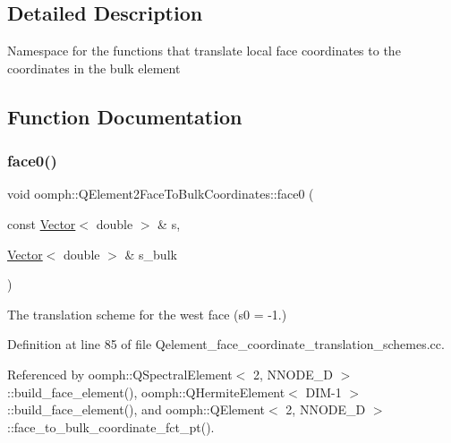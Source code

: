 \subsection{Detailed Description}
Namespace for the functions that translate local face coordinates to the coordinates in the bulk element 

\subsection{Function Documentation}
\mbox{\label{namespaceoomph_1_1QElement2FaceToBulkCoordinates_a4c5f3ae98dff82f924d0423db0e64d1c}} 
\subsubsection{\texorpdfstring{face0()}{face0()}}
{\footnotesize\ttfamily void oomph\+::\+Q\+Element2\+Face\+To\+Bulk\+Coordinates\+::face0 (\begin{DoxyParamCaption}\item[{const \hyperlink{classoomph_1_1Vector}{Vector}$<$ double $>$ \&}]{s,  }\item[{\hyperlink{classoomph_1_1Vector}{Vector}$<$ double $>$ \&}]{s\+\_\+bulk }\end{DoxyParamCaption})}



The translation scheme for the west face (s0 = -\/1.) 



Definition at line 85 of file Qelement\+\_\+face\+\_\+coordinate\+\_\+translation\+\_\+schemes.\+cc.



Referenced by oomph\+::\+Q\+Spectral\+Element$<$ 2, N\+N\+O\+D\+E\+\_\+D $>$\+::build\+\_\+face\+\_\+element(), oomph\+::\+Q\+Hermite\+Element$<$ D\+I\+M-\/1 $>$\+::build\+\_\+face\+\_\+element(), and oomph\+::\+Q\+Element$<$ 2, N\+N\+O\+D\+E\+\_\+D $>$\+::face\+\_\+to\+\_\+bulk\+\_\+coordinate\+\_\+fct\+\_\+pt().

\mbox{\label{namespaceoomph_1_1QElement2FaceToBulkCoordinates_a437c520840c087a1e181a808b169ad7a}} 
